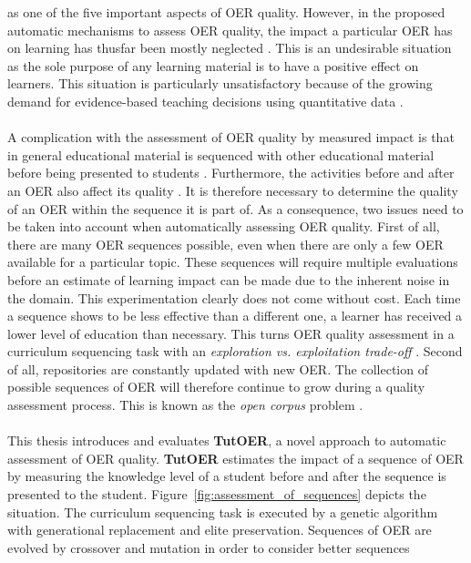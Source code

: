 as one of the five important aspects of OER quality.
However, in the proposed automatic mechanisms to assess OER quality, the impact
a particular OER has on learning has thusfar been mostly neglected
\citep{Kay2007}. This is an undesirable situation as the sole purpose of any
learning material is to have a positive effect on learners. This situation is
particularly unsatisfactory because of the growing demand for evidence-based
teaching decisions using quantitative data \citep{Wayman2005, Marsh2006, Spillane2012, Clow2013}.\\\\
\noindent
A complication with the assessment of OER quality by measured impact is that in
general educational material is sequenced with other educational material
before being presented to students \citep{Brusilovsky1992, Quinn2000}.
Furthermore, the activities before and after an OER also affect its quality
\citep{Duval2006}. It is therefore necessary to determine the quality of an OER
within the sequence it is part of. As a consequence, two issues need to be
taken into account when automatically assessing OER quality. First of all,
there are many OER sequences possible, even when there are only a few OER
available for a particular topic. These sequences will require multiple
evaluations before an estimate of learning impact can be made due to the
inherent noise in the domain. This experimentation clearly does not come
without cost. Each time a sequence shows to be less effective than a different
one, a learner has received a lower level of education than necessary. This
turns OER quality assessment in a curriculum sequencing task
\citep{AlMuhaideb2011} with an \emph{exploration vs. exploitation trade-off}
\citep{Holland1992}. Second of all, repositories are constantly updated with
new OER. The collection of possible sequences of OER will therefore continue to
grow during a quality assessment process. This is known as the \emph{open
corpus} problem \citep{Brusilovsky2007}.\\\\
\noindent
This thesis introduces and evaluates \textbf{TutOER}, a novel approach to
automatic assessment of OER quality. \textbf{TutOER} estimates the impact of a
sequence of OER by measuring the knowledge level of a student before and after the
sequence is presented to the student. Figure~\ref{fig:assessment_of_sequences}
depicts the situation. The curriculum sequencing task is executed by a genetic
algorithm with generational replacement and elite preservation. Sequences of
OER are evolved by crossover and mutation in order to consider better sequences
